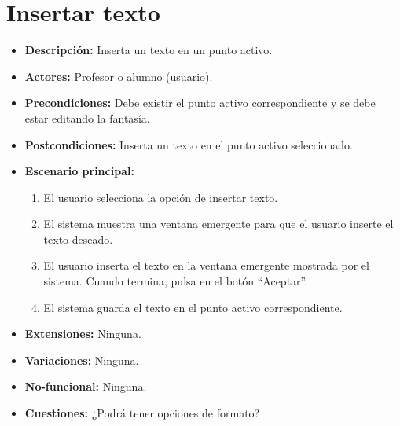 \documentclass[12pt,letterpaper]{article}
\begin{document}
\section{Insertar texto} %
\begin{itemize}
	\item \textbf{Descripción:} Inserta un texto en un punto activo.
	\item \textbf{Actores:} Profesor o alumno (usuario).
	\item \textbf{Precondiciones:} Debe existir el punto activo correspondiente y se debe estar editando la fantasía.
	\item \textbf{Postcondiciones:} Inserta un texto en el punto activo seleccionado.
	\item \textbf{Escenario principal:}
	\begin{enumerate}
		\item El usuario selecciona la opción de insertar texto.
		\item El sistema muestra una ventana emergente para que el usuario inserte el texto deseado.
		\item El usuario inserta el texto en la ventana emergente mostrada por el sistema. Cuando termina, pulsa en el botón ``Aceptar''.
		\item El sistema guarda el texto en el punto activo correspondiente.
	\end{enumerate}
	\item \textbf{Extensiones:} Ninguna.
	\item \textbf{Variaciones:} Ninguna.
	\item \textbf{No-funcional:} Ninguna.
	\item \textbf{Cuestiones:} ¿Podrá tener opciones de formato?
\end{itemize}
\end{document}
